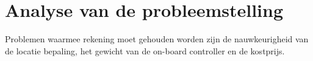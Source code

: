 \chapter{Analyse van de probleemstelling}
Problemen waarmee rekening moet gehouden worden zijn de nauwkeurigheid van de locatie bepaling, het gewicht van de on-board controller en de kostprijs.